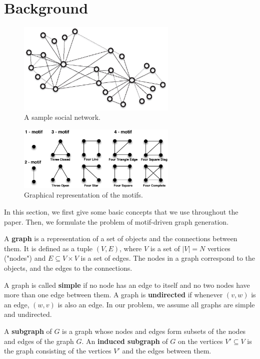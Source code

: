\section{Background}
\label{sec:background}

\begin{figure}[t]
\centering
\includegraphics[width=3in]{Figures/network.eps}
\caption{A sample social network.}
\label{fig:network}
\end{figure}

\begin{figure}[t]
\centering
\includegraphics[width=3in]{Figures/motifs1.eps}
\caption{Graphical representation of the motifs.}
\label{fig:motif}
\end{figure}

In this section, we first give some basic concepts that we use throughout the paper. Then, we formulate the problem of motif-driven graph generation. 

A \textbf{graph} is a representation of a set of objects and the
connections between them.  It is defined as a tuple $(V, E)$, where $V$ is
a set of $|V| = N$ vertices ("nodes") and $E \subseteq V \times V$ is a set of edges.
The nodes in a graph correspond to the objects, and the edges to
the connections.

A graph is called \textbf{simple} if no node has an edge to itself and no two
nodes have more than one edge between them.  A graph is \textbf{undirected}
if whenever $(v, w)$ is an edge, $(w, v)$ is also an edge.  In our problem, 
we assume all graphs are simple and undirected.

A \textbf{subgraph} of $G$ is a graph whose nodes and edges form subsets of 
the nodes and edges of the graph $G$.  An
\textbf{induced subgraph} of $G$ on the vertices $V' \subseteq V$ is the
graph consisting of the vertices $V'$ and the edges between them.

